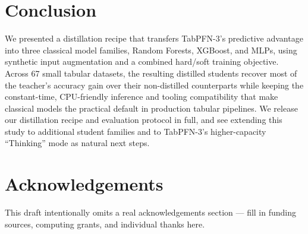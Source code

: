 \documentclass[10pt]{article}
\begin{document}
\section{Conclusion}
We presented a distillation recipe that transfers TabPFN-3's
predictive advantage into three classical model families, Random
Forests, XGBoost, and MLPs, using synthetic input augmentation and a
combined hard/soft training objective. Across 67 small tabular
datasets, the resulting distilled students recover most of the
teacher's accuracy gain over their non-distilled counterparts while
keeping the constant-time, CPU-friendly inference and tooling
compatibility that make classical models the practical default in
production tabular pipelines. We release our distillation recipe and
evaluation protocol in full, and see extending this study to
additional student families and to TabPFN-3's higher-capacity
``Thinking'' mode as natural next steps.

\section*{Acknowledgements}
\small This draft intentionally omits a real acknowledgements
section — fill in funding sources, computing grants, and individual
thanks here.
\end{document}
